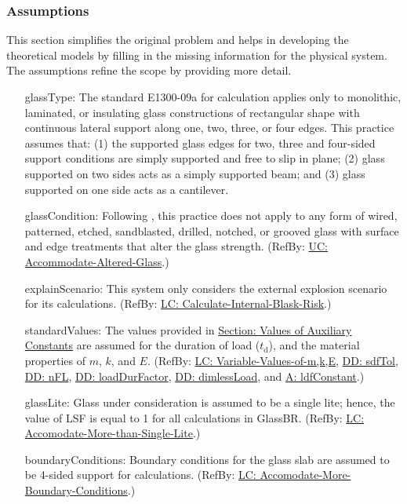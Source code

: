 \documentclass[12pt]{article}
\begin{document}
\subsubsection{Assumptions}
\label{Sec:Assumps}
This section simplifies the original problem and helps in developing the theoretical models by filling in the missing information for the physical system. The assumptions refine the scope by providing more detail.

\begin{itemize}
\item[glassType:\phantomsection\label{assumpGT}]{The standard E1300-09a for calculation applies only to monolithic, laminated, or insulating glass constructions of rectangular shape with continuous lateral support along one, two, three, or four edges. This practice assumes that: (1) the supported glass edges for two, three and four-sided support conditions are simply supported and free to slip in plane; (2) glass supported on two sides acts as a simply supported beam; and (3) glass supported on one side acts as a cantilever.}
\item[glassCondition:\phantomsection\label{assumpGC}]{Following \cite[(pg. 1)]{astm2009}, this practice does not apply to any form of wired, patterned, etched, sandblasted, drilled, notched, or grooved glass with surface and edge treatments that alter the glass strength. (RefBy: \hyperref[accAlteredGlass]{UC: Accommodate-Altered-Glass}.)}
\item[explainScenario:\phantomsection\label{assumpES}]{This system only considers the external explosion scenario for its calculations. (RefBy: \hyperref[calcInternalBlastRisk]{LC: Calculate-Internal-Blask-Risk}.)}
\item[standardValues:\phantomsection\label{assumpSV}]{The values provided in \hyperref[Sec:AuxConstants]{Section: Values of Auxiliary Constants} are assumed for the duration of load (${t_{\text{d}}}$), and the material properties of $m$, $k$, and $E$. (RefBy: \hyperref[varValsOfmkE]{LC: Variable-Values-of-m,k,E}, \hyperref[DD:sdfTol]{DD: sdfTol}, \hyperref[DD:nFL]{DD: nFL}, \hyperref[DD:loadDurFactor]{DD: loadDurFactor}, \hyperref[DD:dimlessLoad]{DD: dimlessLoad}, and \hyperref[assumpLDFC]{A: ldfConstant}.)}
\item[glassLite:\phantomsection\label{assumpGL}]{Glass under consideration is assumed to be a single lite; hence, the value of LSF is equal to 1 for all calculations in GlassBR. (RefBy: \hyperref[accMoreThanSingleLite]{LC: Accomodate-More-than-Single-Lite}.)}
\item[boundaryConditions:\phantomsection\label{assumpBC}]{Boundary conditions for the glass slab are assumed to be 4-sided support for calculations. (RefBy: \hyperref[accMoreBoundaryConditions]{LC: Accomodate-More-Boundary-Conditions}.)}

\end{itemize}
\end{document}
